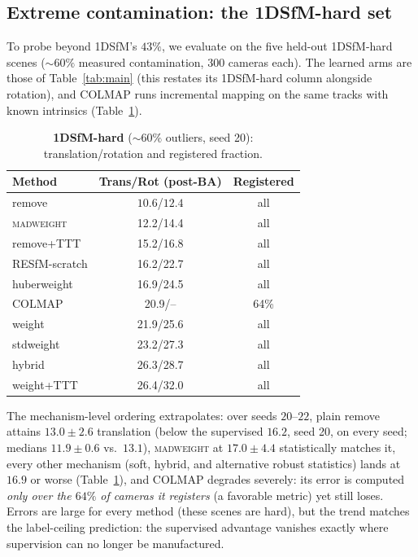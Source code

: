\documentclass[10pt,twocolumn,letterpaper]{article}
\newcommand{\mad}{\textsc{madweight}}
\begin{document}
\subsection{Extreme contamination: the 1DSfM-hard set}\label{sec:extreme}
To probe beyond 1DSfM's $43\%$, we evaluate on the five held-out 1DSfM-hard scenes
($\sim\!60\%$ measured contamination, $300$ cameras each). The learned arms are those of
Table~\ref{tab:main} (this restates its 1DSfM-hard column alongside rotation), and
COLMAP runs incremental mapping on the same tracks with known intrinsics
(Table~\ref{tab:hard}).
\begin{table}[t]\centering\small
\caption{\textbf{1DSfM-hard} ($\sim\!60\%$ outliers, seed 20): translation/rotation
and registered fraction.}
\label{tab:hard}
\begin{tabular}{lcc}
\toprule
Method & Trans/Rot (post-BA) & Registered\\
\midrule
remove & $\mathbf{10.6}$/$\mathbf{12.4}$ & all\\
\mad{} & 12.2/14.4 & all\\
remove+TTT & 15.2/16.8 & all\\
RESfM-scratch              & 16.2/22.7 & all\\
huberweight & 16.9/24.5 & all\\
COLMAP                     & 20.9/--   & 64\%\\
weight & 21.9/25.6 & all\\
stdweight & 23.2/27.3 & all\\
hybrid & 26.3/28.7 & all\\
weight+TTT & 26.4/32.0 & all\\
\bottomrule
\end{tabular}
\end{table}
The mechanism-level ordering extrapolates: over seeds $20$--$22$, plain remove attains
$13.0\pm2.6$ translation (below the supervised $16.2$, seed 20, on every seed; medians
$11.9\pm0.6$ vs.\ $13.1$), \mad{} at $17.0\pm4.4$ statistically matches it, every other mechanism (soft, hybrid, and alternative robust
statistics) lands at $16.9$ or worse (Table~\ref{tab:hard}), and COLMAP degrades severely: its error is computed
\emph{only over the $64\%$ of cameras it registers} (a favorable metric) yet still loses.
Errors are large for every method (these scenes are hard), but the trend matches the
label-ceiling prediction: the supervised advantage vanishes exactly where supervision can
no longer be manufactured.
\end{document}
